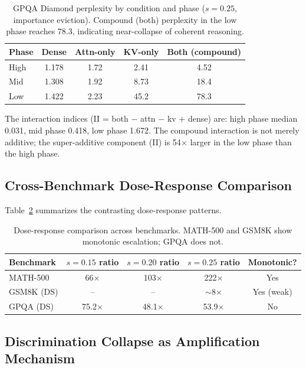 \documentclass[11pt]{article}
\begin{document}
\begin{table}[h]
\centering
\caption{GPQA Diamond perplexity by condition and phase ($s=0.25$, importance eviction). Compound (both) perplexity in the low phase reaches 78.3, indicating near-collapse of coherent reasoning.}
\label{tab:gpqa_ppl}
\begin{tabular}{lcccc}
\toprule
Phase & Dense & Attn-only & KV-only & Both (compound) \\
\midrule
High & 1.178 & 1.72 & 2.41 & 4.52 \\
Mid & 1.308 & 1.92 & 8.73 & 18.4 \\
Low & 1.422 & 2.23 & 45.2 & 78.3 \\
\bottomrule
\end{tabular}
\end{table}

The interaction indices (II = both $-$ attn $-$ kv $+$ dense) are: high phase median 0.031, mid phase 0.418, low phase 1.672. The compound interaction is not merely additive; the super-additive component (II) is 54$\times$ larger in the low phase than the high phase.

\subsection{Cross-Benchmark Dose-Response Comparison}

Table~\ref{tab:cross_bench_dose} summarizes the contrasting dose-response patterns.

\begin{table}[h]
\centering
\caption{Dose-response comparison across benchmarks. MATH-500 and GSM8K show monotonic escalation; GPQA does not.}
\label{tab:cross_bench_dose}
\begin{tabular}{lcccc}
\toprule
Benchmark & $s=0.15$ ratio & $s=0.20$ ratio & $s=0.25$ ratio & Monotonic? \\
\midrule
MATH-500 & 66$\times$ & 103$\times$ & 222$\times$ & Yes \\
GSM8K (DS) & -- & -- & $\sim$8$\times$ & Yes (weak) \\
GPQA (DS) & 75.2$\times$ & 48.1$\times$ & 53.9$\times$ & No \\
\bottomrule
\end{tabular}
\end{table}

\subsection{Discrimination Collapse as Amplification Mechanism}
\end{document}
